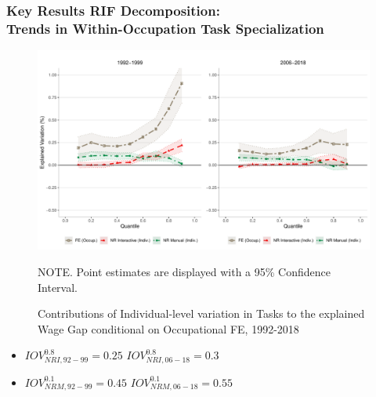 \documentclass[10pt]{beamer}
\begin{document}

\begin{frame}[label=wi_spec]
	\frametitle{Key Results RIF Decomposition: \\ Trends in Within-Occupation Task Specialization}
	
	\begin{figure}[H]
		\begin{minipage}{0.95\textwidth} %
			\centering
			\includegraphics[scale=0.26]{rif_wi_nrinrm}
			\caption{Contributions of Individual-level variation in Tasks to the explained Wage Gap conditional on Occupational FE, 1992-2018  \label{fig:wgap_win}}
			{\footnotesize \tiny NOTE. \textemdash  Point estimates are displayed with a 95\% Confidence Interval. \par}
		\end{minipage}
	\end{figure}
	
\def\HS{\hspace{\fontdimen2\font}}

\begin{itemize} 
	\item $IOV_{NRI, 92-99}^{0.8} = 0.25$ \HS\HS\HS\HS\HS $IOV_{NRI, 06-18}^{0.8} = 0.3$
	\item $IOV_{NRM, 92-99}^{0.1} = 0.45$ \HS\HS\HS
	 $IOV_{NRM, 06-18}^{0.1} = 0.55$ 
\end{itemize} 

	
\end{frame}
\end{document}

